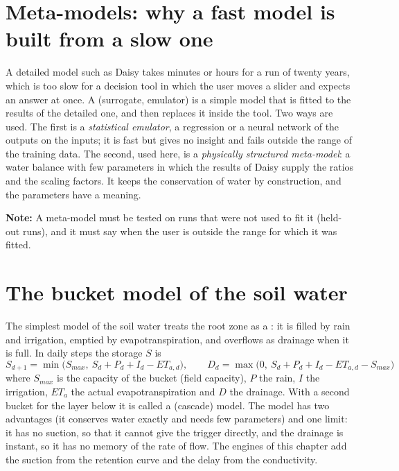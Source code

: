 \section{Meta-models: why a fast model is built from a slow one}
A detailed model such as Daisy takes minutes or hours for a run of twenty years, which is too slow for a decision tool in which the user moves a slider and expects an answer at once. A  (surrogate, emulator) is a simple model that is fitted to the results of the detailed one, and then replaces it inside the tool. Two ways are used. The first is a \emph{statistical emulator}, a regression or a neural network of the outputs on the inputs; it is fast but gives no insight and fails outside the range of the training data. The second, used here, is a \emph{physically structured meta-model}: a water balance with few parameters in which the results of Daisy supply the ratios and the scaling factors. It keeps the conservation of water by construction, and the parameters have a meaning.
\par\noindent \textbf{Note:} A meta-model must be tested on runs that were not used to fit it (held-out runs), and it must say when the user is outside the range for which it was fitted.

\section{The bucket model of the soil water}
The simplest model of the soil water treats the root zone as a : it is filled by rain and irrigation, emptied by evapotranspiration, and overflows as drainage when it is full. In daily steps the storage $S$ is
\begin{equation*}\boxed{S_{d+1}=\min\bigl(S_{max},\ S_d+P_d+I_d-ET_{a,d}\bigr),\qquad D_d=\max\bigl(0,\ S_d+P_d+I_d-ET_{a,d}-S_{max}\bigr)}\end{equation*}
where $S_{max}$ is the capacity of the bucket (field capacity), $P$ the rain, $I$ the irrigation, $ET_a$ the actual evapotranspiration and $D$ the drainage. With a second bucket for the layer below it is called a  (cascade) model. The model has two advantages (it conserves water exactly and needs few parameters) and one limit: it has no suction, so that it cannot give the trigger directly, and the drainage is instant, so it has no memory of the rate of flow. The engines of this chapter add the suction from the retention curve and the delay from the conductivity.

